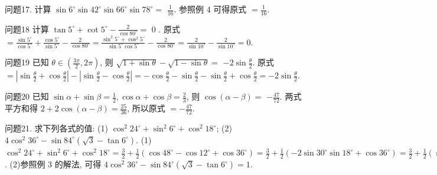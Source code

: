 问题17. 计算 $\sin 6^{\circ} \sin 42^{\circ} \sin 66^{\circ} \sin 78^{\circ}=$
$\frac{1}{16}$. 参照例 4 可得原式 $=\frac{1}{16}$.



问题18 计算 $\tan 5^{\circ}+\cot 5^{\circ}-\frac{2}{\cos 80^{\circ}}=$
0 . 原式 $=\frac{\sin 5^{\circ}}{\cos 5^{\circ}}+\frac{\cos 5^{\circ}}{\sin 5^{\circ}}-\frac{2}{\cos 80^{\circ}}=\frac{\sin ^2 5^{\circ}+\cos ^2 5^{\circ}}{\sin 5^{\circ} \cos 5^{\circ}}-\frac{2}{\cos 80^{\circ}}= \frac{2}{\sin 10^{\circ}}-\frac{2}{\sin 10^{\circ}}=0$.



问题19 已知 $\theta \in\left(\frac{3 \pi}{2}, 2 \pi\right)$, 则 $\sqrt{1+\sin \theta}-\sqrt{1-\sin \theta}=$
$-2 \sin \frac{\theta}{2}$. 原式 $=\left|\sin \frac{\theta}{2}+\cos \frac{\theta}{2}\right|-\left|\sin \frac{\theta}{2}-\cos \frac{\theta}{2}\right|=-\cos \frac{\theta}{2}- \sin \frac{\theta}{2}-\sin \frac{\theta}{2}+\cos \frac{\theta}{2}=-2 \sin \frac{\theta}{2}$.



问题20 已知 $\sin \alpha+\sin \beta=\frac{1}{2}, \cos \alpha+\cos \beta=\frac{2}{3}$, 则 $\cos (\alpha-\beta)=$
$-\frac{47}{72}$. 两式平方和得 $2+2 \cos (\alpha-\beta)=\frac{25}{36}$, 所以原式 $=-\frac{47}{72}$.



问题21. 求下列各式的值:
(1) $\cos ^2 24^{\circ}+\sin ^2 6^{\circ}+\cos ^2 18^{\circ}$;
(2) $4 \cos ^2 36^{\circ}-\sin 84^{\circ}\left(\sqrt{3}-\tan 6^{\circ}\right)$.
(1) $\cos ^2 24^{\circ}+\sin ^2 6^{\circ}+\cos ^2 18^{\circ}=\frac{3}{2}+\frac{1}{2}\left(\cos 48^{\circ}-\cos 12^{\circ}+\right. \left.\cos 36^{\circ}\right)=\frac{3}{2}+\frac{1}{2}\left(-2 \sin 30^{\circ} \sin 18^{\circ}+\cos 36^{\circ}\right)=\frac{3}{2}+\frac{1}{2}\left(\sin 54^{\circ}-\sin 18^{\circ}\right)= \frac{3}{2}+\cos 36^{\circ} \sin 18^{\circ}=\frac{3}{2}+\frac{\cos 36^{\circ} \sin 18^{\circ} \cos 18^{\circ}}{\cos 18^{\circ}}=\frac{3}{2}+\frac{\frac{1}{4} \sin 72^{\circ}}{\cos 18^{\circ}}=\frac{7}{4}$.
 (2)参照例 3 的解法, 可得 $4 \cos ^2 36^{\circ}-\sin 84^{\circ}\left(\sqrt{3}-\tan 6^{\circ}\right)=1$.



